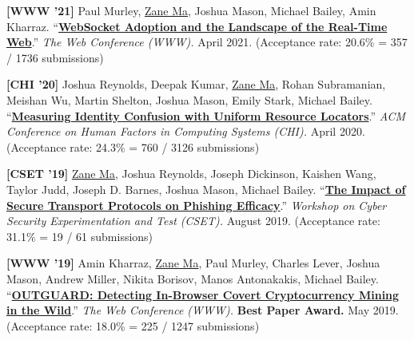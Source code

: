 \documentclass[10pt,singlecolumn]{article} %
\begin{document}
\begin{etaremune}

\item \textbf{[WWW '21]}
Paul Murley, \underline{Zane Ma}, Joshua Mason, Michael Bailey, Amin Kharraz.
``\textbf{\href{https://zanema.com/papers/www21_websockets.pdf}{WebSocket Adoption and the Landscape of the Real-Time Web}}.''
\emph{The Web Conference (WWW).} April 2021.
(Acceptance rate: 20.6\% = 357 / 1736 submissions)
\vspace{6pt}


\item \textbf{[CHI '20]}
Joshua Reynolds, Deepak Kumar, \underline{Zane Ma}, Rohan Subramanian, Meishan Wu, Martin Shelton, Joshua Mason, Emily Stark, Michael Bailey.
``\textbf{\href{https://zanema.com/papers/chi20_urlconfusion.pdf}{Measuring Identity Confusion with Uniform Resource Locators}}.''
\emph{ACM Conference on Human Factors in Computing Systems (CHI).} April 2020.
(Acceptance rate: 24.3\% = 760 / 3126 submissions)
\vspace{6pt}


\item \textbf{[CSET '19]}
\underline{Zane Ma}, Joshua Reynolds, Joseph Dickinson, Kaishen Wang, Taylor Judd, Joseph D. Barnes, Joshua Mason, Michael Bailey.
``\textbf{\href{https://zanema.com/papers/cset19_httpsphishing.pdf}{The Impact of Secure Transport Protocols on Phishing Efficacy}}.''
\emph{Workshop on Cyber Security Experimentation and Test (CSET).} August 2019.
(Acceptance rate: 31.1\% = 19 / 61 submissions)
\vspace{6pt}


\item  \textbf{[WWW '19]}
Amin Kharraz, \underline{Zane Ma}, Paul Murley, Charles Lever, Joshua Mason, Andrew Miller, Nikita Borisov, Manos Antonakakis, Michael Bailey. 
``\textbf{\href{https://zanema.com/papers/www19_cryptojacking.pdf}{OUTGUARD: Detecting In-Browser Covert Cryptocurrency Mining in the Wild}}.''
\emph{The Web Conference (WWW).} \textbf{\color{headings}Best Paper Award.} May 2019.
(Acceptance rate: 18.0\% = 225 / 1247 submissions)
\vspace{6pt}



\end{etaremune}
\end{document}
